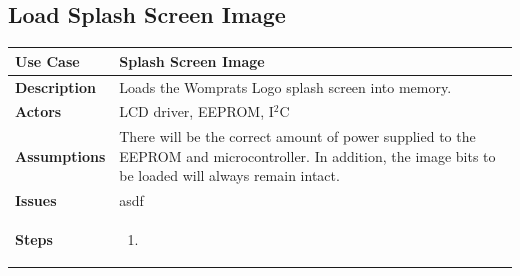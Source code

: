 \documentclass{article}
\begin{document}
\subsection{Load Splash Screen Image}
\begin{tabular}{|p{1in}|p{5in}|}
\hline
\textbf{Use Case} & Splash Screen Image\\
\hline
\textbf{Description} & Loads the Womprats Logo splash screen into memory.\\
\hline
\textbf{Actors} & LCD driver, EEPROM, I$^2$C\\
\hline
\textbf{Assumptions} & There will be the correct amount of power supplied to the EEPROM and microcontroller.  In addition, the image bits to be loaded will always remain intact.\\
\hline
\textbf{Issues} & asdf\\
\hline
\textbf{Steps} & \begin{enumerate}
\item
\end{enumerate}\\
\hline
\end{tabular}
\end{document}
